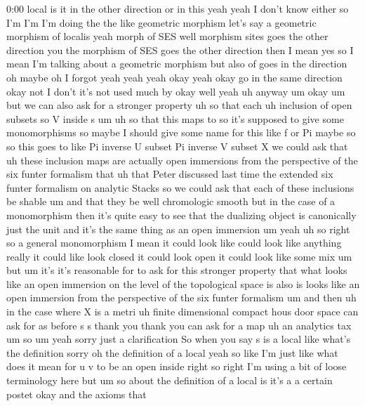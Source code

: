 \begin{unfinished}{0:00}
local  is  it  in  the  other  direction  or  in
this  yeah  yeah  I  don't  know  either  so
I'm  I'm  I'm  doing  the  the  like  geometric
morphism  let's  say  a  geometric  morphism
of  localis  yeah  morph  of  SES  well
morphism  sites  goes  the  other  direction
you  the  morphism  of  SES  goes  the  other
direction  then  I  mean  yes  so  I  mean  I'm
talking  about  a  geometric
morphism  but  also  of  goes  in  the
direction  oh  maybe  oh  I  forgot  yeah  yeah
yeah  okay  yeah  okay  go  in  the  same
direction  okay  not  I
don't  it's  not  used  much
by  okay  well
yeah  uh  anyway  um  okay  um  but  we  can
also  ask  for  a  stronger
property
uh  so  that
each  uh  inclusion  of  open
subsets  so  V  inside  s
um  uh  so  that  this  maps  to  so  it's
supposed  to  give  some  monomorphisms  so
maybe  I  should  give  some  name  for  this
like  f  or  Pi  maybe  so
so  this  goes  to  like  Pi  inverse  U  subset
Pi  inverse  V  subset  X  we  could  ask  that
uh  these  inclusion  maps  are  actually
open
immersions  from  the  perspective  of  the
six  funter
formalism  that  uh  that  Peter  discussed
last  time  the  extended  six  funter
formalism  on  analytic  Stacks  so  we  could
ask  that  each  of  these  inclusions  be
shable  um  and  that  they  be  well
chromologic
smooth  but  in  the  case  of  a  monomorphism
then  it's  quite  easy  to  see  that  the
dualizing  object  is  canonically  just  the
unit  and  it's  the  same  thing  as  an  open
immersion  um
yeah  uh
so  right  so  a  general  monomorphism  I
mean  it  could  look  like  could  look  like
anything  really  it  could  like  look
closed  it  could  look  open  it  could  look
like  some  mix  um  but  um  it's  it's
reasonable  for  to  ask  for  this  stronger
property  that  what  looks  like  an  open
immersion  on  the  level  of  the
topological  space  is  also  is  looks  like
an  open  immersion  from  the  perspective
of  the  six  funter
formalism  um  and  then  uh  in  the
case  where  X  is  a  metri
uh  finite
dimensional  compact  hous  door  space  can
ask  for  as  before  s  s  thank  you  thank
you  can  ask  for  a
map  uh  an  analytics
tax
um  so  um  yeah  sorry  just  a  clarification
So  when  you  say  s  is  a  local  like  what's
the  definition  sorry  oh  the  definition
of  a  local  yeah  so  like  I'm  just  like
what  does  it  mean  for  u  v  to  be  an  open
inside  right  so  right  I'm  using  a  bit  of
loose  terminology  here  but  um  so  about
the  definition  of  a  local  is  it's  a  a
certain  postet  okay  and  the  axioms  that

\end{unfinished}
